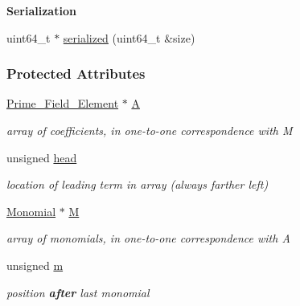 \begin{Indent}\textbf{ Serialization}\par
\begin{DoxyCompactItemize}
\item 
uint64\+\_\+t $\ast$ \hyperlink{group__polygroup_aafc581313f33e812add8db45cfaa1492}{serialized} (uint64\+\_\+t \&size)
\end{DoxyCompactItemize}
\end{Indent}
\subsubsection*{Protected Attributes}
\begin{DoxyCompactItemize}
\item 
\mbox{\label{group__polygroup_a0b78eef8746e334e8db176d479e734b9}} 
\hyperlink{group___fields_group_class_prime___field___element}{Prime\+\_\+\+Field\+\_\+\+Element} $\ast$ \hyperlink{group__polygroup_a0b78eef8746e334e8db176d479e734b9}{A}
\begin{DoxyCompactList}\small\item\em array of coefficients, in one-\/to-\/one correspondence with {\ttfamily M} \end{DoxyCompactList}\item 
\mbox{\label{group__polygroup_ab82cd79a8965d04717a0c82ae79ff4b4}} 
unsigned \hyperlink{group__polygroup_ab82cd79a8965d04717a0c82ae79ff4b4}{head}
\begin{DoxyCompactList}\small\item\em location of leading term in array (always farther left) \end{DoxyCompactList}\item 
\mbox{\label{group__polygroup_aec23722090ac440cee1be3cb54ed5d16}} 
\hyperlink{group__polygroup_class_monomial}{Monomial} $\ast$ \hyperlink{group__polygroup_aec23722090ac440cee1be3cb54ed5d16}{M}
\begin{DoxyCompactList}\small\item\em array of monomials, in one-\/to-\/one correspondence with {\ttfamily A} \end{DoxyCompactList}\item 
\mbox{\label{group__polygroup_acbd3e3d53eefdfae5b59431d40ccd11b}} 
unsigned \hyperlink{group__polygroup_acbd3e3d53eefdfae5b59431d40ccd11b}{m}
\begin{DoxyCompactList}\small\item\em position {\bfseries after} last monomial \end{DoxyCompactList}\end{DoxyCompactItemize}
